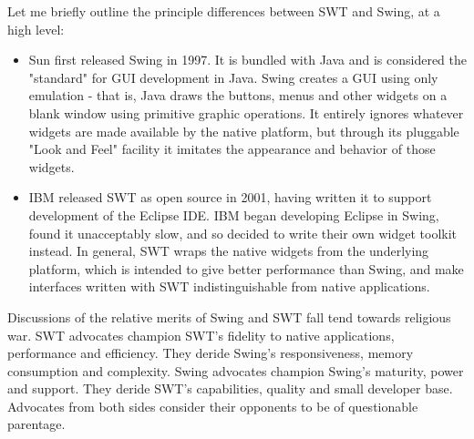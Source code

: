 \documentclass{article}
\begin{document}
Let me briefly outline the principle differences between SWT and Swing,
at a high level:

\begin{itemize}
\item Sun first released Swing in 1997. It is bundled with Java and is
considered the "standard" for GUI development in Java. Swing creates
a GUI using only emulation - that is, Java draws the buttons, menus
and other widgets on a blank window using primitive graphic
operations. It entirely ignores whatever widgets are made available
by the native platform, but through its pluggable "Look and Feel"
facility it imitates the appearance and behavior of those widgets.
\item IBM released SWT as open source in 2001, having written it to support
development of the Eclipse IDE. IBM began developing Eclipse in
Swing, found it unacceptably slow, and so decided to write their own
widget toolkit instead. In general, SWT wraps the native widgets from
the underlying platform, which is intended to give better performance
than Swing, and make interfaces written with SWT indistinguishable
from native applications.
\end{itemize}

Discussions of the relative merits of Swing and SWT fall tend towards
religious war. SWT advocates champion SWT's fidelity to native
applications, performance and efficiency. They deride Swing's
responsiveness, memory consumption and complexity. Swing advocates
champion Swing's maturity, power and support. They deride SWT's
capabilities, quality and small developer base. Advocates from both
sides consider their opponents to be of questionable parentage.
\end{document}

